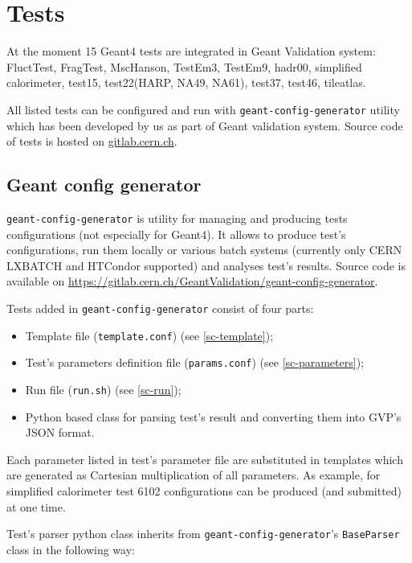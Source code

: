 \section{Tests}
\label{sec-tests}

At the moment 15 Geant4 tests are integrated in Geant Validation system: FluctTest, FragTest, MscHanson, TestEm3, TestEm9, hadr00, simplified calorimeter, test15, test22(HARP, NA49, NA61), test37, test46, tileatlas.

All listed tests can be configured and run with {\tt geant-config-generator} utility which has been developed by us as part of Geant validation system. Source code of tests is hosted on \url{gitlab.cern.ch}.

\subsection{Geant config generator}
\label{sec-geant-config-generator}

{\tt geant-config-generator} is utility for managing and producing tests configurations (not especially for Geant4). It allows to produce test's configurations, run them locally or various batch systems (currently only CERN LXBATCH and HTCondor supported) and analyses test's results. Source code is available on \url{https://gitlab.cern.ch/GeantValidation/geant-config-generator}.

Tests added in {\tt geant-config-generator} consist of four parts:

\begin{itemize}
	\item Template file ({\tt template.conf}) (see \ref{sc-template});
	\item Test's parameters definition file ({\tt params.conf}) (see \ref{sc-parameters});
	\item Run file ({\tt run.sh}) (see \ref{sc-run});
	\item Python based class for parsing test's result and converting them into GVP's JSON format.
\end{itemize}

Each parameter listed in test's parameter file are substituted in templates which are generated as Cartesian multiplication of all parameters. As example, for simplified calorimeter test 6102 configurations can be produced (and submitted) at one time.

Test's parser python class inherits from {\tt geant-config-generator}'s {\tt BaseParser} class in the following way:

